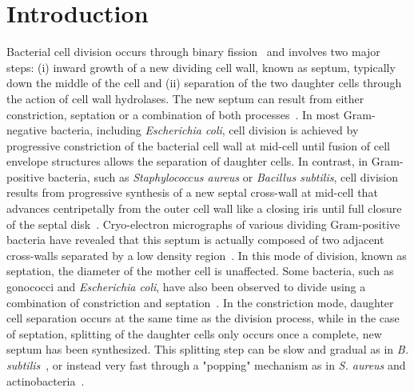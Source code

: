 \section{Introduction}

Bacterial cell division occurs through binary fission~\cite{harryBacterialCellDivision2006} and involves two major steps: (i) inward growth of a new dividing cell wall, known as septum, typically down the middle of the cell and (ii) separation of the two daughter cells through the action of cell wall hydrolases.
The new septum can result from either constriction, septation or a combination of both processes~\cite{ericksonHowBacterialCell2017,navarroCellWallSynthesis2022}.
In most Gram-negative bacteria, including \textit{Escherichia coli}, cell division is achieved by progressive constriction of the bacterial cell wall at mid-cell until fusion of cell envelope structures allows the separation of daughter cells.
In contrast, in Gram-positive bacteria, such as \textit{Staphylococcus aureus} or \textit{Bacillus subtilis}, cell division results from progressive synthesis of a new septal cross-wall at mid-cell that advances centripetally from the outer cell wall like a closing iris until full closure of the septal disk~\cite{beveridgeUltrastructureGramPositiveCell2006,giesbrechtStaphylococcalCellWall1998}.
Cryo-electron micrographs of various dividing Gram-positive bacteria have revealed that this septum is actually composed of two adjacent cross-walls separated by a low density region~\cite{matiasNativeCellWall2006,matiasCryoelectronMicroscopyCell2007,zuberGranularLayerPeriplasmic2006,sextonSuperresolutionConfocalCryoCLEM2022,murrayCellDivisionDeinococcus1983}.
In this mode of division, known as septation, the diameter of the mother cell is unaffected.
Some bacteria, such as gonococci and \textit{Escherichia coli}, have also been observed to divide using a combination of constriction and septation~\cite{navarroCellWallSynthesis2022,westling-haggstromGrowthPatternCell1977}.
In the constriction mode, daughter cell separation occurs at the same time as the division process, while in the case of septation, splitting of the daughter cells only occurs once a complete, new septum has been synthesized.
This splitting step can be slow and gradual as in \textit{B. subtilis}~\cite{smithAutolysinsBacillusSubtilis2000}, or instead very fast through a "popping" mechanism as in \textit{S. aureus} and actinobacteria~\cite{monteiroCellShapeDynamics2015,zhouMechanicalCrackPropagation2015,zhouFastMechanicallyDriven2016}.

